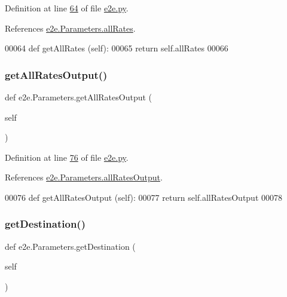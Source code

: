 Definition at line \hyperlink{e2e_8py_source_l00064}{64} of file \hyperlink{e2e_8py_source}{e2e.\+py}.



References \hyperlink{e2e_8py_source_l00030}{e2e.\+Parameters.\+all\+Rates}.


\begin{DoxyCode}
00064     \textcolor{keyword}{def }getAllRates (self):
00065         \textcolor{keywordflow}{return} self.allRates
00066 
\end{DoxyCode}
\mbox{\label{classe2e_1_1_parameters_af47d493a07f5127e633d5efccb5fac5e}} 
\subsubsection{\texorpdfstring{get\+All\+Rates\+Output()}{getAllRatesOutput()}}
{\footnotesize\ttfamily def e2e.\+Parameters.\+get\+All\+Rates\+Output (\begin{DoxyParamCaption}\item[{}]{self }\end{DoxyParamCaption})}



Definition at line \hyperlink{e2e_8py_source_l00076}{76} of file \hyperlink{e2e_8py_source}{e2e.\+py}.



References \hyperlink{e2e_8py_source_l00032}{e2e.\+Parameters.\+all\+Rates\+Output}.


\begin{DoxyCode}
00076     \textcolor{keyword}{def }getAllRatesOutput (self):
00077         \textcolor{keywordflow}{return} self.allRatesOutput
00078 
\end{DoxyCode}
\mbox{\label{classe2e_1_1_parameters_ad984826a5973fff569b554b44245b714}} 
\subsubsection{\texorpdfstring{get\+Destination()}{getDestination()}}
{\footnotesize\ttfamily def e2e.\+Parameters.\+get\+Destination (\begin{DoxyParamCaption}\item[{}]{self }\end{DoxyParamCaption})}



